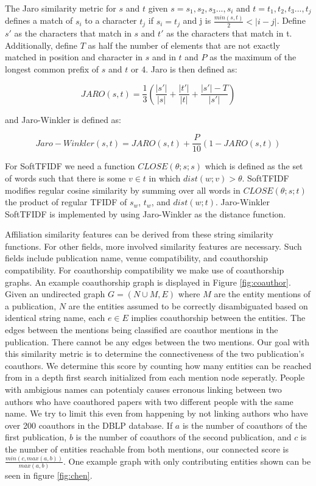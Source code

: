 \documentclass[twocolumn,letterpaper]{article}
\begin{document}
The Jaro similarity metric for $s$ and $t$ given $s= s_1,s_2,s_3...,s_i$ and $t= t_1,t_2,t_3...,t_j$ defines a match of $s_i$ to a character $t_j$ if $s_i=t_j$ and j is $\frac{min(s,t)}{2} < |i-j|$. Define $s'$ as the characters that match in $s$ and $t'$ as the characters that match in t. Additionally, define $T$ as half the number of elements that are not exactly matched in position and character in $s$ and in $t$ and $P$ as the maximum of the longest common prefix of $s$ and $t$ or 4. Jaro is then defined as:
\begin{center}
\[
	JARO(s,t) = \frac{1}{3}\left(\frac{|s'|}{|s|}+\frac{|t'|}{|t|}+\frac{|s'|-T}{|s'|}\right)
\]
\end{center}

and Jaro-Winkler is defined as:
\begin{center}
\[
	Jaro-Winkler(s,t) = JARO(s,t) + \frac{P}{10}(1-JARO(s,t))
\]
\end{center}

For SoftTFIDF we need a function $CLOSE(\theta; s; s)$ which is defined as the set of words such that there is some $v \in t$ in which $dist(w; v) > \theta$. SoftTFIDF modifies regular cosine similarity by summing over all words in $CLOSE(\theta; s; t)$ the product of regular TFIDF of $s_w$, $t_w$, and $dist(w;t)$. Jaro-Winkler SoftTFIDF is implemented by using Jaro-Winkler as the distance function.

Affiliation similarity features can be derived from these string similarity functions. For other fields, more involved similarity features are necessary. Such fields include publication name, venue compatibility, and coauthorship compatibility.  For coauthorship compatibility we make use of coauthorship graphs. An example coauthorship graph is displayed in Figure \ref{fig:coauthor}. Given an undirected graph $G=(N \cup M,E)$ where $M$ are the entity mentions of a publication, $N$ are the entities assumed to be correctly disambiguated based on identical string name, each $e \in E$ implies coauthorship between the entities. The edges between the mentions being classified are coauthor mentions in the publication. There cannot be any edges between the two mentions. Our goal with this similarity metric is to determine the connectiveness of the two publication's coauthors. We determine this score by counting how many entities can be reached from in a depth first search initialized from each mention node seperatly. People with ambigious names can potentialy causes erronous linking between two authors who have coauthored papers with two different people with the same name. We try to limit this even from happening by not linking authors who have over 200 coauthors in the DBLP database. If $a$ is the number of coauthors of the first publication, $b$ is the number of coauthors of the second publication, and $c$ is the number of entities reachable from both mentions, our connected score is $\frac{min(c,max(a,b))}{max(a,b)}$. One example graph with only contributing entities shown can be seen in figure \ref{fig:chen}.
\end{document}
